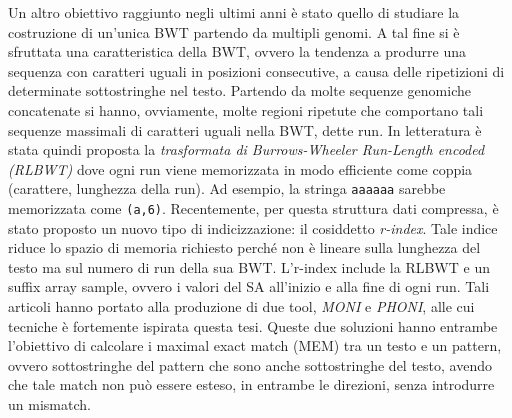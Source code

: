 \documentclass[a4paper,11pt, oneside,italian]{article}
\begin{document}
Un altro obiettivo raggiunto negli ultimi anni è stato quello di studiare la
costruzione di un'unica BWT partendo da multipli genomi.
A tal fine si è sfruttata una caratteristica della BWT, ovvero la
tendenza a produrre una sequenza con caratteri uguali in posizioni
consecutive, a causa delle ripetizioni di determinate
sottostringhe nel testo. Partendo da molte sequenze genomiche concatenate si
hanno, ovviamente, molte regioni ripetute che comportano tali sequenze massimali
di caratteri uguali nella BWT, dette run.
%
In letteratura è stata quindi proposta la \textit{trasformata di Burrows-Wheeler
  Run-Length encoded (RLBWT)} dove ogni run viene memorizzata in modo efficiente
come coppia (carattere, lunghezza della run). Ad esempio, la stringa
\texttt{aaaaaa} sarebbe memorizzata come \texttt{(a,6)}.
Recentemente, per questa struttura dati compressa, è stato proposto un nuovo
tipo di indicizzazione: il cosiddetto \textit{r-index}. Tale indice riduce lo
spazio di memoria richiesto perché non è lineare sulla lunghezza del testo ma
sul numero di run della sua BWT.
L'r-index include la
RLBWT e un suffix array sample, ovvero i valori del SA all’inizio e alla fine di
ogni run. 
Tali articoli hanno portato alla produzione di due tool, \textit{MONI} e 
\textit{PHONI}, alle cui tecniche è fortemente ispirata questa tesi. Queste due
soluzioni hanno entrambe l'obiettivo di 
calcolare i maximal exact match (MEM) tra un testo e un pattern, ovvero
sottostringhe del pattern che 
sono anche sottostringhe del testo, avendo che tale match non può essere esteso,
in entrambe le direzioni, senza introdurre un mismatch. 
\end{document}
